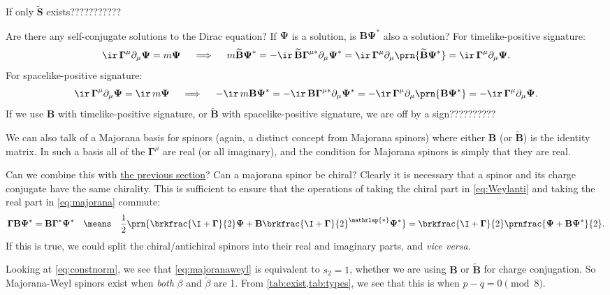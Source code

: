 \documentclass[11pt]{article}
\newcommand{\Gammab}{\boldsymbol{\Gamma}}
\newcommand{\muc}{{\mu\ast}}
\renewcommand{\S}{\mathbf{S}}
\newcommand{\B}{\mathbf{B}}
\newcommand{\Bt}{\widetilde{\B}}
\newcommand{\St}{\widetilde{\S}}
\newcommand{\Psib}{\boldsymbol{\Psi}}
\newcommand{\betat}{\tilde{\beta}}
\begin{document}
If only \(\St\) exists???????????

Are there any self-conjugate solutions to the Dirac equation?
If \(\Psib\) is a solution, is \(\B \Psib^\ast\) also a solution?
For timelike-positive signature:
%
\begin{equation*}
  \ir\, \Gammab^\mu \partial_\mu \Psib = m \Psib
  \quad\implies\quad
  m \Bt \Psib^\ast 
    = - \ir\, \Bt \Gammab^\muc \partial_\mu \Psib^\ast 
    = \ir\, \Gammab^\mu \partial_\mu \prn{\Bt \Psib^\ast} 
    = \ir\, \Gammab^\mu \partial_\mu \Psib. 
\end{equation*}
%
For spacelike-positive signature:
%
\begin{equation*}
  \ir\, \Gammab^\mu \partial_\mu \Psib = \ir\, m \Psib
  \quad\implies\quad
  - \ir\, m \B \Psib^\ast 
    = - \ir\, \B \Gammab^\muc \partial_\mu \Psib^\ast 
    = - \ir\, \Gammab^\mu \partial_\mu \prn{\B \Psib^\ast} 
    = - \ir\, \Gammab^\mu \partial_\mu \Psib. 
\end{equation*}
%
If we use \(\B\) with timelike-positive signature, or \(\Bt\) with spacelike-positive signature, we are off by a sign??????????


We can also talk of a Majorana basis for spinors (again, a distinct concept from Majorana spinors) where either $\B$ (or $\Bt$) is the identity matrix.
In such a basis all of the $\Gammab^\mu$ are real (or all imaginary), and the condition for Majorana spinors is simply that they are real.

Can we combine this with \hyperref[sec:weyl]{the previous section}?
Can a majorana spinor be chiral?
Clearly it is necessary that a spinor and its charge conjugate  have the same chirality.
This is sufficient to ensure that the operations of taking the chiral part in \cref{eq:Weylanti} and taking the real part in \cref{eq:majorana} commute:
%
\begin{equation}\label{eq:majoranaweyl}
  \Gammab \B \Psib^\ast = \B \Gammab^\ast \Psib^\ast
  \quad\means\quad
  \frac{1}{2}\prn{\brkfrac{\I+\Gammab}{2} \Psib 
    + \B \brkfrac{\I+\Gammab}{2}^{\mathrlap{\ast}} \Psib^\ast} 
    = \brkfrac{\I+\Gammab}{2} \prnfrac{\Psib + \B \Psib^\ast}{2}.
\end{equation}
%
If this is true, we could split the chiral/antichiral spinors into their real and imaginary parts, and \emph{vice versa}.

Looking at \cref{eq:constnorm}, we see that \cref{eq:majoranaweyl} is equivalent to \(s_2 = 1\), whether we are using \(\B\) or \(\Bt\) for charge conjugation.
So Majorana-Weyl spinors exist when \emph{both} \(\beta\) and \(\betat\) are 1.
From \cref{tab:exist,tab:types}, we see that this is when \( p-q = 0 \pmod 8 \).
\end{document}
